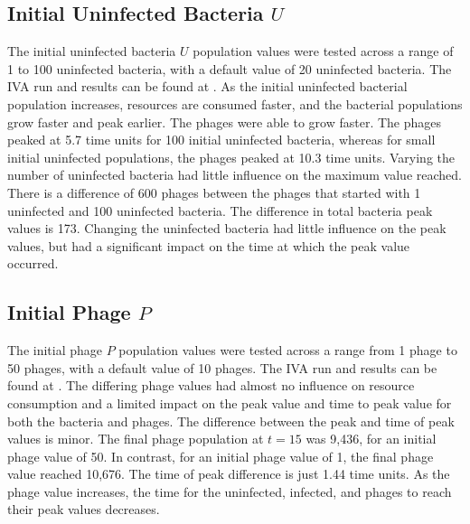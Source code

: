 \subsection{Initial Uninfected Bacteria $U$}
The initial uninfected bacteria $U$ population values were tested across a range of 1 to 100 uninfected bacteria, with a default value of 20 uninfected bacteria. 
The IVA run and results can be found at . 
As the initial uninfected bacterial population increases, resources are consumed faster, and the bacterial populations grow faster and peak earlier. The phages were able to grow faster. The phages peaked at 5.7 time units for 100 initial uninfected bacteria, whereas for small initial uninfected populations, the phages peaked at 10.3 time units. Varying the number of uninfected bacteria had little influence on the maximum value reached. There is a difference of 600 phages between the phages that started with 1 uninfected and 100 uninfected bacteria. The difference in total bacteria peak values is 173. Changing the uninfected bacteria had little influence on the peak values, but had a significant impact on the time at which the peak value occurred. 

\subsection{Initial Phage $P$}
The initial phage $P$ population values were tested across a range from 1 phage to 50 phages, with a default value of 10 phages. 
The IVA run and results can be found at . 
The differing phage values had almost no influence on resource consumption and a limited impact on the peak value and time to peak value for both the bacteria and phages. 
The difference between the peak and time of peak values is minor. 
The final phage population at $t=15$ was 9,436, for an initial phage value of 50. In contrast, for an initial phage value of 1, the final phage value reached 10,676. 
The time of peak difference is just 1.44 time units. 
As the phage value increases, the time for the uninfected, infected, and phages to reach their peak values decreases. 

